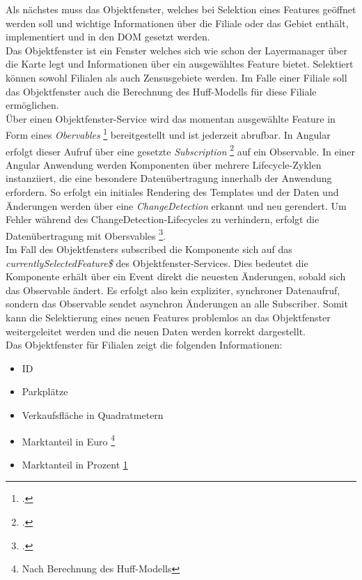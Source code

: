 Als nächstes muss das Objektfenster, welches bei Selektion eines Features geöffnet werden soll und wichtige Informationen über die Filiale oder das Gebiet enthält, implementiert und in den DOM gesetzt werden.\\
Das Objektfenster ist ein Fenster welches sich wie schon der Layermanager über die Karte legt und Informationen über ein ausgewähltes Feature bietet. 
Selektiert können sowohl Filialen als auch Zensusgebiete werden.
Im Falle einer Filiale soll das Objektfenster auch die Berechnung des Huff-Modells für diese Filiale ermöglichen.\\
Über einen Objektfenster-Service wird das momentan ausgewählte Feature in Form eines \emph{Obervables} \footcite{rxjs_observable} bereitgestellt und ist jederzeit abrufbar.
In Angular erfolgt dieser Aufruf über eine gesetzte \emph{Subscription} \footcite{rxjs_subscription} auf ein Observable.
In einer Angular Anwendung werden Komponenten über mehrere Lifecycle-Zyklen instanziiert, die eine besondere Datenübertragung innerhalb der Anwendung erfordern.
So erfolgt ein initiales Rendering des Templates und der Daten und Änderungen werden über eine \emph{ChangeDetection} erkannt und neu gerendert.
Um Fehler während des ChangeDetection-Lifecycles zu verhindern, erfolgt die Datenübertragung mit Obersvables \footcite{angular_lifecycle}.\\
Im Fall des Objektfensters subscribed die Komponente sich auf das \emph{currentlySelectedFeature\$} des Objektfenster-Services.
Dies bedeutet die Komponente erhält über ein Event direkt die neuesten Änderungen, sobald sich das Observable ändert. 
Es erfolgt also kein expliziter, synchroner Datenaufruf, sondern das Observable sendet asynchron Änderungen an alle Subscriber.
Somit kann die Selektierung eines neuen Features problemlos an das Objektfenster weitergeleitet werden und die neuen Daten werden korrekt dargestellt. \\
Das Objektfenster für Filialen zeigt die folgenden Informationen:

\begin{itemize}
	\item ID
	\item Parkplätze
	\item Verkaufsfläche in Quadratmetern
	\item Marktanteil in Euro \footnote{\label{afterCalc}Nach Berechnung des Huff-Modells}
	\item Marktanteil in Prozent \cref{afterCalc}
\end{itemize}

